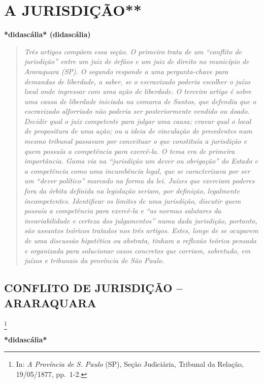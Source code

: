 \part{A JURISDIÇÃO**}

\textbf{*didascália* (didascália)}

\begin{quote}
\emph{Três artigos compõem essa seção. O primeiro trata de um ``conflito
de jurisdição'' entre um juiz de órfãos e um juiz de direito no
município de Araraquara (SP). O segundo responde a uma pergunta-chave
para demandas de liberdade, a saber, se o escravizado poderia escolher o
juízo local onde ingressar com uma ação de liberdade. O terceiro artigo
é sobre uma causa de liberdade iniciada na comarca de Santos, que
defendia que o escravizado alforriado não poderia ser posteriormente
vendido ou doado. Decidir qual o juiz competente para julgar uma causa;
cravar qual o local de propositura de uma ação; ou a ideia de vinculação
de precedentes num mesmo tribunal passavam por conceituar o que
constituía a jurisdição e quem possuía a competência para exercê-la. O
tema era de primeira importância. Gama via na ``jurisdição um dever ou
obrigação'' do Estado e a competência como uma incumbência legal, que se
caracterizava por ser um ``dever político'' marcado na forma da lei.
Juízes que exerciam poderes fora da órbita definida na legislação
seriam, por definição, legalmente incompetentes. Identificar os limites
de uma jurisdição, discutir quem possuía a competência para exercê-la e
``as normas salutares da invariabilidade e certeza dos julgamentos''
numa dada jurisdição, portanto, são assuntos teóricos tratados nos três
artigos. Estes, longe de se ocuparem de uma discussão hipotética ou
abstrata, tinham a reflexão teórica pensada e organizada para solucionar
casos concretos que corriam, sobretudo, em juízos e tribunais da
província de São Paulo. }
\end{quote}

\chapter{CONFLITO DE JURISDIÇÃO -- ARARAQUARA}

\footnote{In: \emph{A Província de S. Paulo} (SP), Seção Judiciária,
  Tribunal da Relação, 19/05/1877, pp.~1-2.}

\textbf{*didascália*}

